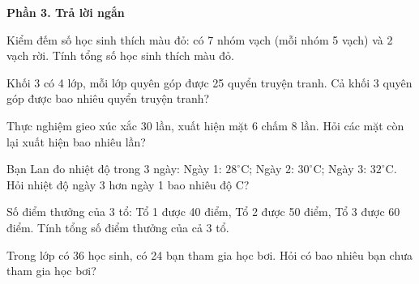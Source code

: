 \textbf{Phần 3. Trả lời ngắn}

\begin{ex} %
Kiểm đếm số học sinh thích màu đỏ: có 7 nhóm vạch (mỗi nhóm 5 vạch) và 2 vạch rời. Tính tổng số học sinh thích màu đỏ.
\end{ex}

\begin{ex} %
Khối 3 có 4 lớp, mỗi lớp quyên góp được 25 quyển truyện tranh. Cả khối 3 quyên góp được bao nhiêu quyển truyện tranh?
\end{ex}

\begin{ex} %
Thực nghiệm gieo xúc xắc 30 lần, xuất hiện mặt 6 chấm 8 lần. Hỏi các mặt còn lại xuất hiện bao nhiêu lần?
\end{ex}

\begin{ex} %
Bạn Lan đo nhiệt độ trong 3 ngày: Ngày 1: $28^\circ\text{C}$; Ngày 2: $30^\circ\text{C}$; Ngày 3: $32^\circ\text{C}$. Hỏi nhiệt độ ngày 3 hơn ngày 1 bao nhiêu độ C?
\end{ex}

\begin{ex} %
Số điểm thưởng của 3 tổ: Tổ 1 được 40 điểm, Tổ 2 được 50 điểm, Tổ 3 được 60 điểm. Tính tổng số điểm thưởng của cả 3 tổ.
\end{ex}

\begin{ex} %
Trong lớp có 36 học sinh, có 24 bạn tham gia học bơi. Hỏi có bao nhiêu bạn chưa tham gia học bơi?
\end{ex}
